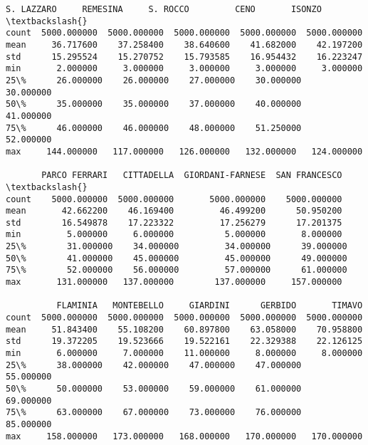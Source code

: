 \documentclass[11pt]{article}
\begin{document}
\begin{tcolorbox}[breakable, size=fbox, boxrule=.5pt, pad at break*=1mm, opacityfill=0]
\begin{Verbatim}[commandchars=\\\{\}]
        S. LAZZARO     REMESINA     S. ROCCO         CENO       ISONZO  \textbackslash{}
count  5000.000000  5000.000000  5000.000000  5000.000000  5000.000000
mean     36.717600    37.258400    38.640600    41.682000    42.197200
std      15.295524    15.270752    15.793585    16.954432    16.223247
min       2.000000     3.000000     3.000000     3.000000     3.000000
25\%      26.000000    26.000000    27.000000    30.000000    30.000000
50\%      35.000000    35.000000    37.000000    40.000000    41.000000
75\%      46.000000    46.000000    48.000000    51.250000    52.000000
max     144.000000   117.000000   126.000000   132.000000   124.000000

       PARCO FERRARI   CITTADELLA  GIORDANI-FARNESE  SAN FRANCESCO  \textbackslash{}
count    5000.000000  5000.000000       5000.000000    5000.000000
mean       42.662200    46.169400         46.499200      50.950200
std        16.549878    17.223322         17.256279      17.201375
min         5.000000     6.000000          5.000000       8.000000
25\%        31.000000    34.000000         34.000000      39.000000
50\%        41.000000    45.000000         45.000000      49.000000
75\%        52.000000    56.000000         57.000000      61.000000
max       131.000000   137.000000        137.000000     157.000000

          FLAMINIA   MONTEBELLO     GIARDINI      GERBIDO       TIMAVO
count  5000.000000  5000.000000  5000.000000  5000.000000  5000.000000
mean     51.843400    55.108200    60.897800    63.058000    70.958800
std      19.372205    19.523666    19.522161    22.329388    22.126125
min       6.000000     7.000000    11.000000     8.000000     8.000000
25\%      38.000000    42.000000    47.000000    47.000000    55.000000
50\%      50.000000    53.000000    59.000000    61.000000    69.000000
75\%      63.000000    67.000000    73.000000    76.000000    85.000000
max     158.000000   173.000000   168.000000   170.000000   170.000000
\end{Verbatim}
\end{tcolorbox}
        
\end{document}
